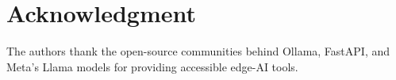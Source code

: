\section*{Acknowledgment}
The authors thank the open-source communities behind Ollama, FastAPI, and Meta's Llama models for providing accessible edge-AI tools.

\balance




